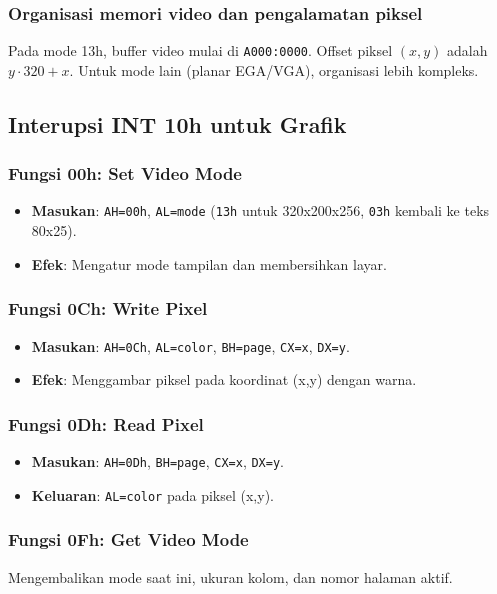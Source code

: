 \subsubsection{Organisasi memori video dan pengalamatan piksel}
Pada mode 13h, buffer video mulai di \texttt{A000:0000}. Offset piksel \((x,y)\) adalah \(y\cdot 320 + x\). Untuk mode lain (planar EGA/VGA), organisasi lebih kompleks.

\subsection{Interupsi INT 10h untuk Grafik}
\subsubsection{Fungsi 00h: Set Video Mode}
\begin{itemize}
  \item \textbf{Masukan}: \texttt{AH=00h}, \texttt{AL=mode} (\texttt{13h} untuk 320x200x256, \texttt{03h} kembali ke teks 80x25).
  \item \textbf{Efek}: Mengatur mode tampilan dan membersihkan layar.
\end{itemize}

\subsubsection{Fungsi 0Ch: Write Pixel}
\begin{itemize}
  \item \textbf{Masukan}: \texttt{AH=0Ch}, \texttt{AL=color}, \texttt{BH=page}, \texttt{CX=x}, \texttt{DX=y}.
  \item \textbf{Efek}: Menggambar piksel pada koordinat (x,y) dengan warna.
\end{itemize}

\subsubsection{Fungsi 0Dh: Read Pixel}
\begin{itemize}
  \item \textbf{Masukan}: \texttt{AH=0Dh}, \texttt{BH=page}, \texttt{CX=x}, \texttt{DX=y}.
  \item \textbf{Keluaran}: \texttt{AL=color} pada piksel (x,y).
\end{itemize}

\subsubsection{Fungsi 0Fh: Get Video Mode}
Mengembalikan mode saat ini, ukuran kolom, dan nomor halaman aktif.

